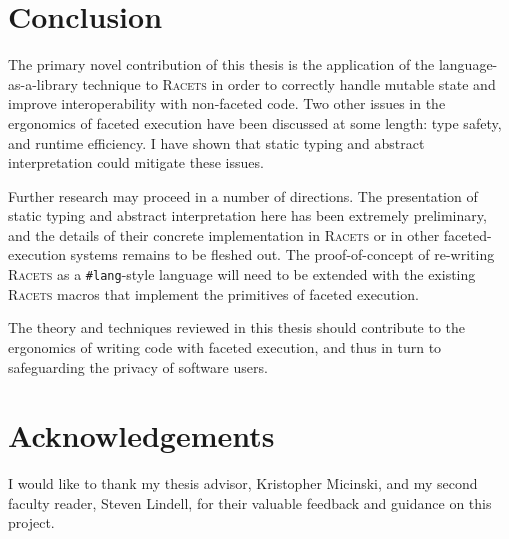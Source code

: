 \documentclass{article}
\begin{document}
\section{Conclusion\label{sec:conclusion}}
The primary novel contribution of this thesis is the application of the language-as-a-library technique to \textsc{Racets} in order to correctly handle mutable state and improve interoperability with non-faceted code. Two other issues in the ergonomics of faceted execution have been discussed at some length: type safety, and runtime efficiency. I have shown that static typing and abstract interpretation could mitigate these issues.

Further research may proceed in a number of directions. The presentation of static typing and abstract interpretation here has been extremely preliminary, and the details of their concrete implementation in \textsc{Racets} or in other faceted-execution systems remains to be fleshed out. The proof-of-concept of re-writing \textsc{Racets} as a \texttt{\#lang}-style language will need to be extended with the existing \textsc{Racets} macros that implement the primitives of faceted execution.

The theory and techniques reviewed in this thesis should contribute to the ergonomics of writing code with faceted execution, and thus in turn to safeguarding the privacy of software users.



\section*{Acknowledgements}
I would like to thank my thesis advisor, Kristopher Micinski, and my second faculty reader, Steven Lindell, for their valuable feedback and guidance on this project.




\end{document}
